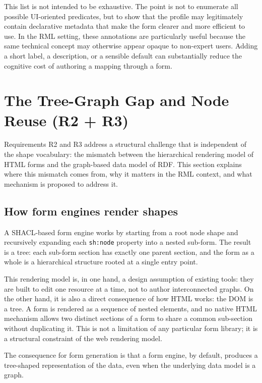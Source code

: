 This list is not intended to be exhaustive.
The point is not to enumerate all possible UI-oriented predicates, but to show that the profile may legitimately contain declarative metadata that make the form clearer and more efficient to use.
In the RML setting, these annotations are particularly useful because the same technical concept may otherwise appear opaque to non-expert users.
Adding a short label, a description, or a sensible default can substantially reduce the cognitive cost of authoring a mapping through a form.

\section{The Tree-Graph Gap and Node Reuse (R2 + R3)}
\label{sec:tree-graph-gap}

Requirements R2 and R3 address a structural challenge that is independent of the shape vocabulary: the mismatch between the hierarchical rendering model of HTML forms and the graph-based data model of RDF.
This section explains where this mismatch comes from, why it matters in the RML context, and what mechanism is proposed to address it.

\subsection{How form engines render shapes}

A SHACL-based form engine works by starting from a root node shape and recursively expanding each \texttt{sh:node} property into a nested sub-form.
The result is a tree: each sub-form section has exactly one parent section, and the form as a whole is a hierarchical structure rooted at a single entry point.

This rendering model is, in one hand, a design assumption of existing tools: they are built to edit one resource at a time, not to author interconnected graphs. On the other hand, it is also a direct consequence of how HTML works: the DOM is a tree.
A form is rendered as a sequence of nested elements, and no native HTML mechanism allows two distinct sections of a form to share a common sub-section without duplicating it.
This is not a limitation of any particular form library; it is a structural constraint of the web rendering model.

The consequence for form generation is that a form engine, by default, produces a tree-shaped representation of the data, even when the underlying data model is a graph.

